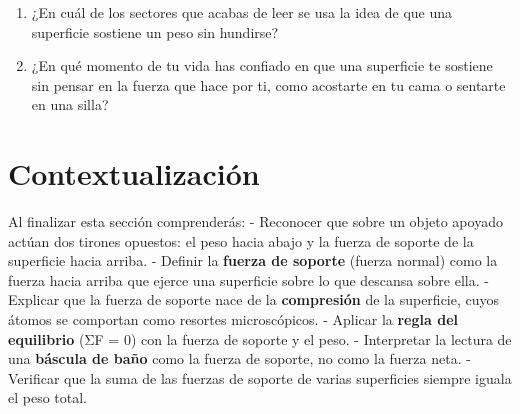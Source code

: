 \documentclass[
  spanish,
  letterpaper,
  12pt,
  oneside,
  open=any,
  DIV=15]{scrbook}
\providecommand{\tightlist}{%
  \setlength{\itemsep}{0pt}\setlength{\parskip}{0pt}}
\newcommand{\setcolorsection}[2]{%
  \definecolor{currentsectionbg}{HTML}{#1}%
  \definecolor{currentsectionborder}{HTML}{#2}%
}
\begin{document}
\begin{tcolorbox}[enhanced jigsaw, arc=.35mm, bottomrule=.15mm, bottomtitle=1mm, breakable, colback=white, colbacktitle=quarto-callout-note-color!10!white, colframe=quarto-callout-note-color-frame, coltitle=black, left=2mm, leftrule=.75mm, opacityback=0, opacitybacktitle=0.6, rightrule=.15mm, title=\textcolor{quarto-callout-note-color}{\faInfo}\hspace{0.5em}{Conexión con el Mundo Real}, titlerule=0mm, toprule=.15mm, toptitle=1mm]

\begin{enumerate}
\def\labelenumi{\arabic{enumi}.}
\tightlist
\item
  ¿En cuál de los sectores que acabas de leer se usa la idea de que una
  superficie sostiene un peso sin hundirse?
\item
  ¿En qué momento de tu vida has confiado en que una superficie te
  sostiene sin pensar en la fuerza que hace por ti, como acostarte en tu
  cama o sentarte en una silla?
\end{enumerate}

\end{tcolorbox}

\setcolorsection{f2c6a0}{e0b088}

\section{Contextualización}\label{contextualizaciuxf3n-4}

\begin{tcolorbox}[enhanced jigsaw, arc=.35mm, bottomrule=.15mm, bottomtitle=1mm, breakable, colback=white, colbacktitle=quarto-callout-important-color!10!white, colframe=quarto-callout-important-color-frame, coltitle=black, left=2mm, leftrule=.75mm, opacityback=0, opacitybacktitle=0.6, rightrule=.15mm, title=\textcolor{quarto-callout-important-color}{\faExclamation}\hspace{0.5em}{Conceptos Clave (Objetivos de Aprendizaje)}, titlerule=0mm, toprule=.15mm, toptitle=1mm]

Al finalizar esta sección comprenderás: - Reconocer que sobre un objeto
apoyado actúan dos tirones opuestos: el peso hacia abajo y la fuerza de
soporte de la superficie hacia arriba. - Definir la \textbf{fuerza de
soporte} (fuerza normal) como la fuerza hacia arriba que ejerce una
superficie sobre lo que descansa sobre ella. - Explicar que la fuerza de
soporte nace de la \textbf{compresión} de la superficie, cuyos átomos se
comportan como resortes microscópicos. - Aplicar la \textbf{regla del
equilibrio} (ΣF = 0) con la fuerza de soporte y el peso. - Interpretar
la lectura de una \textbf{báscula de baño} como la fuerza de soporte, no
como la fuerza neta. - Verificar que la suma de las fuerzas de soporte
de varias superficies siempre iguala el peso total.

\end{tcolorbox}
\end{document}
